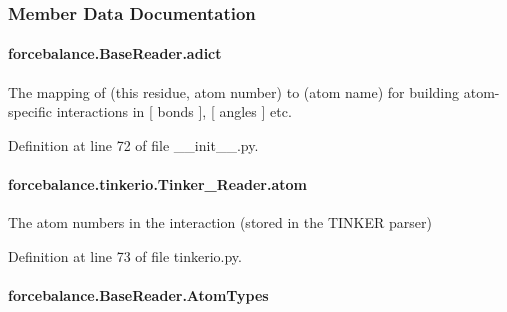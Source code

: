 \subsubsection{Member Data Documentation}
\hypertarget{classforcebalance_1_1BaseReader_a2c46ad6b66cf09a30e917ce4a1997e2a}{
\paragraph[{adict}]{\setlength{\rightskip}{0pt plus 5cm}forcebalance.\-Base\-Reader.\-adict\hspace{0.3cm}{\ttfamily [inherited]}}}\label{classforcebalance_1_1BaseReader_a2c46ad6b66cf09a30e917ce4a1997e2a}


The mapping of (this residue, atom number) to (atom name) for building atom-\/specific interactions in \mbox{[} bonds \mbox{]}, \mbox{[} angles \mbox{]} etc. 



Definition at line 72 of file \-\_\-\-\_\-init\-\_\-\-\_\-.\-py.

\hypertarget{classforcebalance_1_1tinkerio_1_1Tinker__Reader_a77b335b67d8e723248ac52515867607d}{
\paragraph[{atom}]{\setlength{\rightskip}{0pt plus 5cm}forcebalance.\-tinkerio.\-Tinker\-\_\-\-Reader.\-atom}}\label{classforcebalance_1_1tinkerio_1_1Tinker__Reader_a77b335b67d8e723248ac52515867607d}


The atom numbers in the interaction (stored in the T\-I\-N\-K\-E\-R parser) 



Definition at line 73 of file tinkerio.\-py.

\hypertarget{classforcebalance_1_1BaseReader_a69ca7d949a4a3df4d9f61e617fe0e270}{
\paragraph[{Atom\-Types}]{\setlength{\rightskip}{0pt plus 5cm}forcebalance.\-Base\-Reader.\-Atom\-Types\hspace{0.3cm}{\ttfamily [inherited]}}}\label{classforcebalance_1_1BaseReader_a69ca7d949a4a3df4d9f61e617fe0e270}


